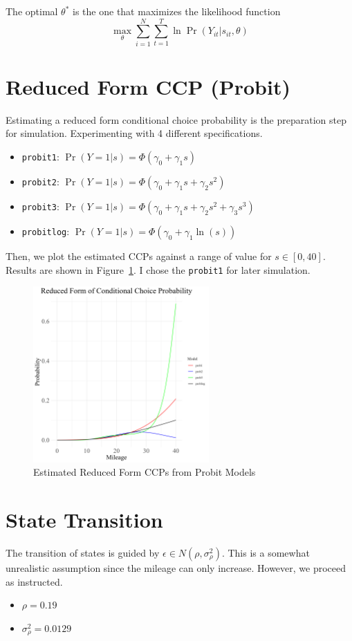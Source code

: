 \documentclass[12pt]{article}[margin=1in]
\begin{document}
The optimal $\theta^*$ is the one that maximizes the likelihood function
\begin{equation}\label{eq:likelihood}
    \max_{\theta} \sum_{i=1}^N \sum_{t=1}^T \ln \Pr(Y_{it}|s_{it},\theta)
\end{equation}

\section{Reduced Form CCP (Probit)}

Estimating a reduced form conditional choice probability is the preparation
step for simulation. Experimenting with 4 different specifications.
\begin{itemize}
    \item \verb|probit1|: $\Pr(Y=1|s) = \Phi(\gamma_0 + \gamma_1 s)$
    \item \verb|probit2|: $\Pr(Y=1|s) = \Phi(\gamma_0 + \gamma_1 s + \gamma_2 s^2)$
    \item \verb|probit3|: $\Pr(Y=1|s) = \Phi(\gamma_0 + \gamma_1 s + \gamma_2 s^2 + \gamma_3 s^3)$
    \item \verb|probitlog|: $\Pr(Y=1|s) = \Phi(\gamma_0 + \gamma_1 \ln(s))$
\end{itemize}
Then, we plot the estimated CCPs against a range of value for $s\in[0,40]$. Results are shown in Figure~\ref{fig:ccp_probit}. I chose the \verb|probit1| for later simulation.
\begin{figure}[!htbp]
    \centering
    \includegraphics[width=0.6\textwidth]{../Figures/ccp_probit.png}
    \caption{Estimated Reduced Form CCPs from Probit Models}
    \label{fig:ccp_probit}
\end{figure}

\section{State Transition}
The transition of states is guided by $\epsilon\in N(\rho, \sigma_{\rho}^2)$.
This is a somewhat unrealistic assumption since the mileage can only increase.
However, we proceed as instructed.
\begin{itemize}
    \item $\rho=0.19$
    \item $\sigma_{\rho}^2=0.0129$
\end{itemize}
\end{document}
